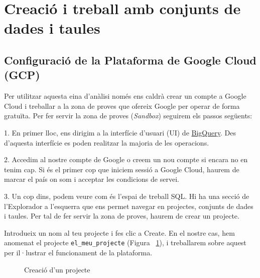 \documentclass[12pt,longbibliography]{article}
\theoremstyle{definition}
\theoremstyle{remark}
\begin{document}
\pagebreak

\section{Creació i treball amb conjunts de dades i taules}

\subsection{Configuració de la Plataforma de Google Cloud (GCP)}

\graphicspath{ {BigQuery/Imatges tutorial/} }

Per utilitzar aquesta eina d’anàlisi només ens caldrà crear un compte a Google Cloud i treballar a la zona de proves que ofereix Google per operar de forma gratuïta.
Per fer servir la zona de proves (\textit{Sandbox}) seguirem els passos següents: 

\vspace{2mm}

1. En primer lloc, ens dirigim a la interfície d’usuari (UI) de \href{https://console.cloud.google.com}{BigQuery}. Des d'aquesta interfície es poden realitzar la majoria de les operacions.

\vspace{2mm}

2. Accedim al nostre compte de Google o creem un nou compte si encara no en tenim cap. Si és el primer cop que iniciem sessió a Google Cloud, haurem de marcar el país on som i acceptar les condicions de servei.

\vspace{2mm}

3. Un cop dins, podem veure com és l'espai de treball SQL. Hi ha una secció de l'Explorador a l'esquerra que ens permet navegar en projectes, conjunts de dades i taules. Per tal de fer servir la zona de proves, haurem de crear un projecte.

Introdueix un nom al teu projecte i fes clic a Create. En el nostre cas, hem anomenat el projecte \verb|el_meu_projecte| (Figura ~\ref{fig:bq1}), i treballarem sobre aquest per il·lustrar el funcionament de la plataforma.

\vspace{2mm}
\begin{figure}[h!]
\par
{}%
\hfill
{}%
\par
\caption{Creació d'un projecte}
\label{fig:bq1}
\end{figure}
\vspace{2mm}
\end{document}
